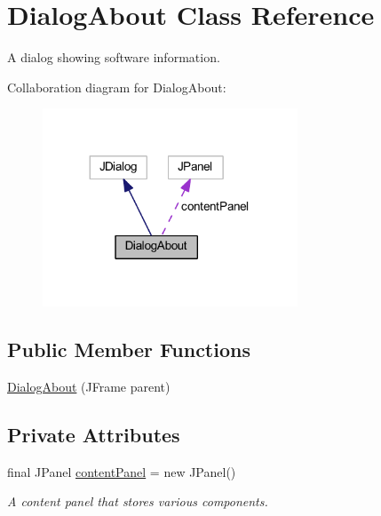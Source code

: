 \hypertarget{classcom_1_1lclion_1_1midigui_1_1_dialog_about}{\section{Dialog\+About Class Reference}
\label{classcom_1_1lclion_1_1midigui_1_1_dialog_about}
}


A dialog showing software information.  




Collaboration diagram for Dialog\+About\+:\nopagebreak
\begin{figure}[H]
\begin{center}
\leavevmode
\includegraphics[width=215pt]{classcom_1_1lclion_1_1midigui_1_1_dialog_about__coll__graph}
\end{center}
\end{figure}
\subsection*{Public Member Functions}
\begin{DoxyCompactItemize}
\item 
\hyperlink{classcom_1_1lclion_1_1midigui_1_1_dialog_about_ae16533b3b532405ec4d2aea64d0ff351}{Dialog\+About} (J\+Frame parent)
\end{DoxyCompactItemize}
\subsection*{Private Attributes}
\begin{DoxyCompactItemize}
\item 
final J\+Panel \hyperlink{classcom_1_1lclion_1_1midigui_1_1_dialog_about_ac383c7b38c74b9e1cc245a00de4fbb5e}{content\+Panel} = new J\+Panel()
\begin{DoxyCompactList}\small\item\em A content panel that stores various components. \end{DoxyCompactList}\end{DoxyCompactItemize}


